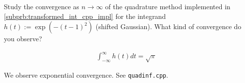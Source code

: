 \begin{problem}
 \begin{subproblem}[1]
  Study the convergence as $n \rightarrow \infty$ of the quadrature method implemented in \ref{subprb:transformed_int_cpp_impl} for the integrand $h(t) := \exp(-(t-1)^2)$ (shifted Gaussian). What kind of convergence do you observe?
  \begin{hint}
  \begin{align}
   \int_{-\infty}^{\infty} h(t) dt = \sqrt{\pi}
  \end{align}
  \end{hint}
\cprotEnv \begin{solution}
   We observe exponential convergence. See \verb|quadinf.cpp|.
  \end{solution}
 \end{subproblem}

\end{problem}
 
